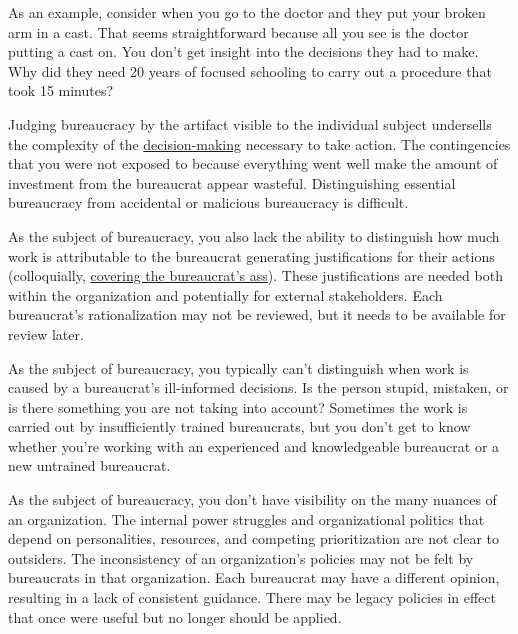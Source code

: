 As an example, consider when you go to the doctor and they put your broken arm in a cast. That seems straightforward because all you see is the doctor putting a cast on. You don't get insight into the decisions they had to make. Why did they need 20 years of focused schooling to carry out a procedure that took 15 minutes?

Judging bureaucracy by the artifact visible to the individual subject undersells the complexity of the 
\href{https://en.wikipedia.org/wiki/Decision-making}{decision-making}
necessary to take action. The contingencies that you were not exposed to because everything went well make the amount of investment from the bureaucrat appear wasteful. Distinguishing essential bureaucracy from accidental or malicious bureaucracy is difficult.

As the subject of bureaucracy, you also lack the ability to distinguish how much work is attributable to the bureaucrat generating justifications for their actions (colloquially, \href{https://en.wikipedia.org/wiki/Cover_your_ass}{covering the bureaucrat's ass}). 
\iftoggle{WPinmargin}{\marginpar{$>$Wikipedia: Cover your ass}}{}
These justifications are needed both within the organization and potentially for external stakeholders. Each bureaucrat's rationalization may not be reviewed, but it needs to be available for review later.

As the subject of bureaucracy, you typically can't distinguish when work is caused by a bureaucrat's ill-informed decisions. Is the person stupid, mistaken, or is there something you are not taking into account?
Sometimes the work is carried out by insufficiently trained bureaucrats, but you don't get to know whether you're working with an experienced and knowledgeable bureaucrat or a new untrained bureaucrat. 

As the subject of bureaucracy, you don't have visibility on the many nuances of an organization. The internal power struggles and organizational politics that depend on personalities, resources, and competing prioritization are not clear to outsiders.
The inconsistency of an organization's policies may not be felt by bureaucrats in that organization. Each bureaucrat may have a different opinion, resulting in a lack of consistent guidance.
There may be legacy policies in effect that once were useful but no longer should be applied.

